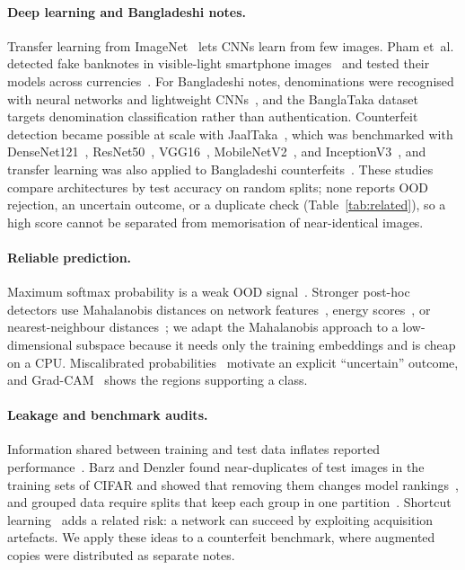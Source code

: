 \documentclass[pdflatex,iicol,sn-mathphys-num]{sn-jnl}
\begin{document}
\paragraph{Deep learning and Bangladeshi notes.} Transfer learning from
ImageNet~\cite{deng2009imagenet,yosinski2014transferable} lets CNNs learn from few
images. Pham et~al. detected fake banknotes in visible-light smartphone
images~\cite{pham2020} and tested their models across currencies~\cite{pham2022}. For Bangladeshi notes, denominations were recognised with neural
networks and lightweight CNNs~\cite{jahangir2007,linkon2020}, and the BanglaTaka
dataset~\cite{nuhash2025banglataka} targets denomination classification rather than
authentication. Counterfeit detection became possible at scale with
JaalTaka~\cite{piyas2025jaaltaka}, which was benchmarked with
DenseNet121~\cite{huang2017densenet}, ResNet50~\cite{he2016resnet},
VGG16~\cite{simonyan2015vgg}, MobileNetV2~\cite{sandler2018mobilenetv2}, and
InceptionV3~\cite{szegedy2016inception}, and transfer learning was also applied to
Bangladeshi counterfeits~\cite{tabassum2025}.
These studies compare architectures by test accuracy on random splits; none reports
OOD rejection, an uncertain outcome, or a duplicate check (Table~\ref{tab:related}), so a
high score cannot be separated from memorisation of near-identical images.

\paragraph{Reliable prediction.} Maximum softmax probability is a weak OOD
signal~\cite{hendrycks2017baseline}. Stronger post-hoc detectors use Mahalanobis
distances on network features~\cite{lee2018mahalanobis}, energy
scores~\cite{liu2020energy}, or nearest-neighbour distances~\cite{sun2022knn}; we adapt
the Mahalanobis approach to a low-dimensional subspace because it needs only the training
embeddings and is cheap on a CPU. Miscalibrated
probabilities~\cite{guo2017calibration} motivate an explicit ``uncertain'' outcome, and
Grad-CAM~\cite{selvaraju2017gradcam} shows the regions supporting a class.

\paragraph{Leakage and benchmark audits.} Information shared between training and test
data inflates reported performance~\cite{kaufman2012leakage,kapoor2023leakage}.
Barz and Denzler found near-duplicates of test images in the training sets of CIFAR and
showed that removing them changes model rankings~\cite{barz2020cifair}, and grouped data
require splits that keep each group in one partition~\cite{roberts2017cv}. Shortcut
learning~\cite{geirhos2020shortcut} adds a related risk: a network can succeed by
exploiting acquisition artefacts. We apply these ideas to a counterfeit benchmark, where
augmented copies were distributed as separate notes.
\end{document}
